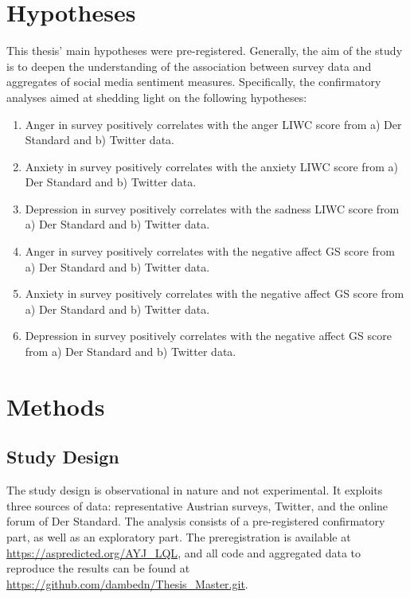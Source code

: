 \documentclass[
  english,
  jou,floatsintext]{apa7}
\begin{document}
\hypertarget{hypotheses}{%
\section{Hypotheses}\label{hypotheses}}

This thesis' main hypotheses were pre-registered. Generally, the aim of the study is to deepen the understanding of the association between survey data and aggregates of social media sentiment measures. Specifically, the confirmatory analyses aimed at shedding light on the following hypotheses:

\begin{enumerate}
    \item Anger in survey positively correlates with the anger LIWC score from a) Der Standard and b) Twitter data.
    \item Anxiety in survey positively correlates with the anxiety LIWC score from a) Der Standard and b) Twitter data.
    \item Depression in survey positively correlates with the sadness LIWC score from a) Der Standard and b) Twitter data.
    \item Anger in survey positively correlates with the negative affect GS score from a) Der Standard and b) Twitter data.
    \item Anxiety in survey positively correlates with the negative affect GS score from a) Der Standard and b) Twitter data.
    \item Depression in survey positively correlates with the negative affect GS score from a) Der Standard and b) Twitter data.
\end{enumerate}

\hypertarget{methods}{%
\section{Methods}\label{methods}}

\hypertarget{study-design}{%
\subsection{Study Design}\label{study-design}}

The study design is observational in nature and not experimental. It exploits three sources of data: representative Austrian surveys, Twitter, and the online forum of Der Standard. The analysis consists of a pre-registered confirmatory part, as well as an exploratory part. The preregistration is available at \url{https://aspredicted.org/AYJ_LQL}, and all code and aggregated data to reproduce the results can be found at \url{https://github.com/dambedn/Thesis_Master.git}.
\end{document}
